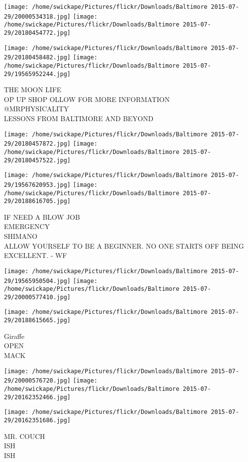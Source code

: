 \documentclass[10pt,letterpaper]{article}
\begin{document}
\texttt{[image: /home/swickape/Pictures/flickr/Downloads/Baltimore 2015-07-29/20000534318.jpg]}
\texttt{[image: /home/swickape/Pictures/flickr/Downloads/Baltimore 2015-07-29/20180454772.jpg]}

\texttt{[image: /home/swickape/Pictures/flickr/Downloads/Baltimore 2015-07-29/20180458482.jpg]}
\texttt{[image: /home/swickape/Pictures/flickr/Downloads/Baltimore 2015-07-29/19565952244.jpg]}

THE MOON LIFE\\
OP UP SHOP OLLOW FOR MORE INFORMATION\\
@MRPHYSICALITY\\
LESSONS FROM BALTIMORE AND BEYOND\\
\pagebreak

\texttt{[image: /home/swickape/Pictures/flickr/Downloads/Baltimore 2015-07-29/20180457872.jpg]}
\texttt{[image: /home/swickape/Pictures/flickr/Downloads/Baltimore 2015-07-29/20180457522.jpg]}

\texttt{[image: /home/swickape/Pictures/flickr/Downloads/Baltimore 2015-07-29/19567620953.jpg]}
\texttt{[image: /home/swickape/Pictures/flickr/Downloads/Baltimore 2015-07-29/20188616705.jpg]}

IF NEED A BLOW JOB\\
EMERGENCY\\
SHIMANO\\
ALLOW YOURSELF TO BE A BEGINNER.  NO ONE STARTS OFF BEING EXCELLENT.  {-} WF\\
\pagebreak

\texttt{[image: /home/swickape/Pictures/flickr/Downloads/Baltimore 2015-07-29/19565950504.jpg]}
\texttt{[image: /home/swickape/Pictures/flickr/Downloads/Baltimore 2015-07-29/20000577410.jpg]}

\vspace{0.25in}
\texttt{[image: /home/swickape/Pictures/flickr/Downloads/Baltimore 2015-07-29/20188615665.jpg]}

Giraffe\\
OPEN\\
MACK\\
\pagebreak

\texttt{[image: /home/swickape/Pictures/flickr/Downloads/Baltimore 2015-07-29/20000576720.jpg]}
\texttt{[image: /home/swickape/Pictures/flickr/Downloads/Baltimore 2015-07-29/20162352466.jpg]}

\texttt{[image: /home/swickape/Pictures/flickr/Downloads/Baltimore 2015-07-29/20162351686.jpg]}

MR. COUCH\\
ISH\\
ISH\\
\pagebreak
\end{document}

